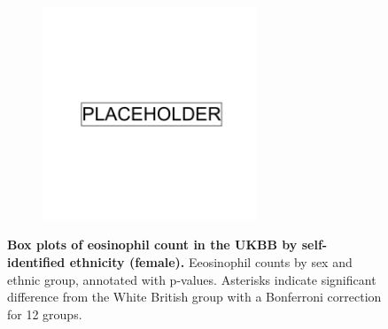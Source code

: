 \begin{figure}[ht]
    \centering
    \begin{subfigure}{\textwidth}
    \includegraphics[width=0.7\textwidth]{placeholder.png}
    \end{subfigure}
    \caption[Box plots of eosinophil count in the UKBB by self-identified ethnicity (female)]{\textbf{Box plots of eosinophil count in the UKBB by self-identified ethnicity (female).} Eeosinophil counts by sex and ethnic group, annotated with p-values. Asterisks indicate significant difference from the White British group with a Bonferroni correction for 12 groups.}
    \label{fig:supp_box_eosinophill_f}
\end{figure}

\newpage

